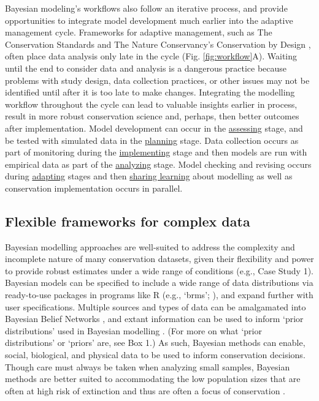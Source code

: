 \documentclass{article}
\begin{document}
\par Bayesian modeling's workflows also follow an iterative process, and provide opportunities to integrate model development much earlier into the adaptive management cycle. Frameworks for adaptive management, such as The Conservation Standards and The Nature Conservancy's Conservation by Design \citep[https://www.conservationbydesign.org/)]{margoluis2013results, kareiva2014evolving}, often place data analysis only late in the cycle (Fig. \ref{fig:workflow}A). Waiting until the end to consider data and analysis is a dangerous practice because problems with study design, data collection practices, or other issues may not be identified until after it is too late to make changes. Integrating the modelling workflow throughout the cycle can lead to valuable insights earlier in process, result in more robust conservation science and, perhaps, then better outcomes after implementation. Model development can occur in the \underline{assessing} stage, and be tested with simulated data in the \underline{planning} stage. Data collection occurs as part of monitoring during the \underline{implementing} stage and then models are run with empirical data as part of the \underline{analyzing} stage. Model checking and revising occurs during \underline{adapting} stages and then \underline{sharing learning} about modelling as well as conservation implementation occurs in parallel.  

\subsection*{Flexible frameworks for complex data}

\par Bayesian modelling approaches are well-suited to address the complexity and incomplete nature of many conservation datasets, given their flexibility and power to provide robust estimates under a wide range of conditions (e.g., Case Study 1). Bayesian models can be specified to include a wide range of data distributions via ready-to-use packages in programs like R (e.g., `brms'; \citep{R,brms}), and expand further with user specifications. Multiple sources and types of data can be amalgamated into Bayesian Belief Networks \citep{marcot2001using,newton2007bayesian}, and extant information can be used to inform `prior distributions' used in Bayesian modelling \citep{o2008informed,mcneish2016using}. (For more on what `prior distributions' or `priors' are, see Box 1.) 
As such, Bayesian methods can enable, social, biological, and physical data to be used to inform conservation decisions. Though care must always be taken when analyzing small samples, Bayesian methods are better suited to accommodating the low population sizes that are often at high risk of extinction and thus are often a focus of conservation \citep{stinchcombe2002influence}. 
\end{document}
